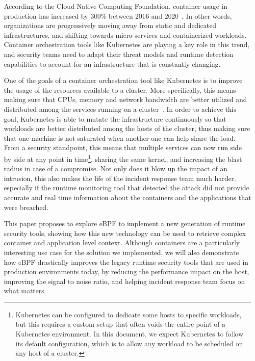 According to the Cloud Native Computing Foundation, container usage in production has increased by 300\% between 2016 and 2020~\cite{RuntimeSecurityMonitoringWithEBPF:CNCF}.
In other words, organizations are progressively moving away from static and dedicated infrastructures, and shifting towards micro-services and containerized workloads.
Container orchestration tools like Kubernetes are playing a key role in this trend, and security teams need to adapt their threat models and runtime detection capabilities to account for an infrastructure that is constantly changing.

One of the goals of a container orchestration tool like Kubernetes is to improve the usage of the resources available to a cluster.
More specifically, this means making sure that CPUs, memory and network bandwidth are better utilized and distributed among the services running on a cluster~\cite{RuntimeSecurityMonitoringWithEBPF:DevopsWithK8s}.
In order to achieve this goal, Kubernetes is able to mutate the infrastructure continuously so that workloads are better distributed among the hosts of the cluster, thus making sure that one machine is not saturated when another one can help share the load.
From a security standpoint, this means that multiple services can now run side by side at any point in time\footnote{Kubernetes can be configured to dedicate some hosts to specific workloads, but this requires a custom setup that often voids the entire point of a Kubernetes environment.
In this document, we expect Kubernetes to follow its default configuration, which is to allow any workload to be scheduled on any host of a cluster.}, sharing the same kernel, and increasing the blast radius in case of a compromise.
Not only does it blow up the impact of an intrusion, this also makes the life of the incident response team much harder, especially if the runtime monitoring tool that detected the attack did not provide accurate and real time information about the containers and the applications that were breached.

This paper proposes to explore eBPF to implement a new generation of runtime security tools, showing how this new technology can be used to retrieve complex container and application level context.
Although containers are a particularly interesting use case for the solution we implemented, we will also demonstrate how eBPF drastically improves the legacy runtime security tools that are used in production environments today, by reducing the performance impact on the host, improving the signal to noise ratio, and helping incident response team focus on what matters.

